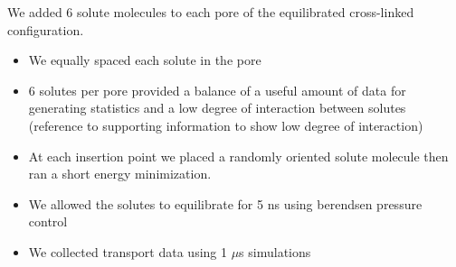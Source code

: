 \documentclass{article}
\begin{document}
  We added 6 solute molecules to each pore of the equilibrated cross-linked
  configuration.
  \begin{itemize}
	\item We equally spaced each solute in the pore
	\item 6 solutes per pore provided a balance of a useful amount of data
	for generating statistics and a low degree of interaction between solutes (reference
	to supporting information to show low degree of interaction)
	\item At each insertion point we placed a randomly oriented solute molecule
	then ran a short energy minimization.
	\item We allowed the solutes to equilibrate for 5 ns using berendsen 
	pressure control
	\item We collected transport data using 1 $\mu$s simulations
  \end{itemize}
  
\end{document}
